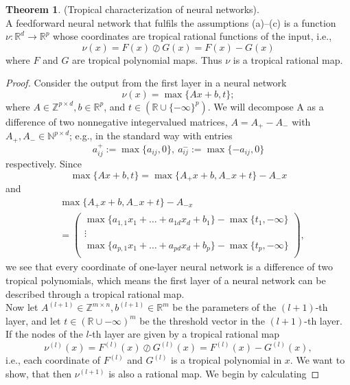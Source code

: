 \documentclass{article}
\theoremstyle{definition}
\newtheorem{theorem}{Theorem}[section]
\begin{document}
\begin{theorem}\hspace{1sp}\cite{zhang2018tropical}
\label{teo:trop_char_of_neur_net}
(Tropical characterization of neural networks). \\
A feedforward neural network that fulfils the assumptions (a)–(c) is a function $\nu : \mathbb{R}^{d} \to \mathbb{R}^{p}$ whose coordinates are tropical rational functions of the input, i.e.,
$$ \nu(x) = F(x) \oslash G(x) = F(x) - G(x) $$
where $F$ and $G$ are tropical polynomial maps. Thus $\nu$ is a tropical rational map.
\end{theorem}
\begin{proof}Consider the output from the first layer in a neural network
$$ \nu(x) = \max \{ Ax+b, t \}; $$
where $A \in \mathbb{Z}^{p \times d}, b \in \mathbb{R}^{p}$, and $t \in (\mathbb{R} \cup \{ - \infty \}^{p})$. We will
decompose A as a difference of two nonnegative integervalued matrices, $A = A_{+} - A_{-}$ with $A_{+},A_{-} \in \mathbb{N}^{p \times d}$; e.g., in the standard way with entries
$$ a^{+}_{ij} := \max \{ a_{ij}, 0 \}, \ a^{-}_{ij} := \max \{ -a_{ij}
 , 0\} $$
respectively. Since
$$ \max \{ Ax + b, t \} = \max \{ A_{+}x+b, A_{-}x+t \} - A_{-}x$$
and
\begin{align*}
&\max \{ A_{+}x+b, A_{-}x+t \} - A_{-x} \\ &= 
 \begin{pmatrix}
  \max\{a_{1,1}x_{1} + \dots + a_{1d}x_{d} + b_1\} - \max\{t_{1},-\infty\}  \\
  \vdots \\
  \max\{a_{p,1}x_{1} + \dots + a_{pd}x_{d} + b_p\} - \max\{t_{p},-\infty\}  \\ 
 \end{pmatrix},
\end{align*}
we see that every coordinate of one-layer neural network
is a difference of two tropical polynomials, which means the first layer of a neural network can be described through a tropical rational map. \\
Now let $A^{(l+1)} \in \mathbb{Z}^{m \times n}, b^{(l+1)} \in \mathbb{R}^{m}$ be the parameters of the $(l+1)$-th layer, and let $t \in (\mathbb{R} \cup {- \infty})^{m}$ be the threshold vector in the $(l+1)$-th layer. If the nodes of the $l$-th layer are given by a tropical rational map
$$ \nu^{(l)}(x) = F^{(l)}(x) \oslash G^{(l)}(x) = F^{(l)}(x)-G^{(l)}(x),$$
i.e., each coordinate of $F^{(l)}$ and $G^{(l)}$ is a tropical polynomial in $x$. We want to show, that then $\nu^{(l+1)}$ is also a rational map. We begin by calculating

\end{proof}
\end{document}
